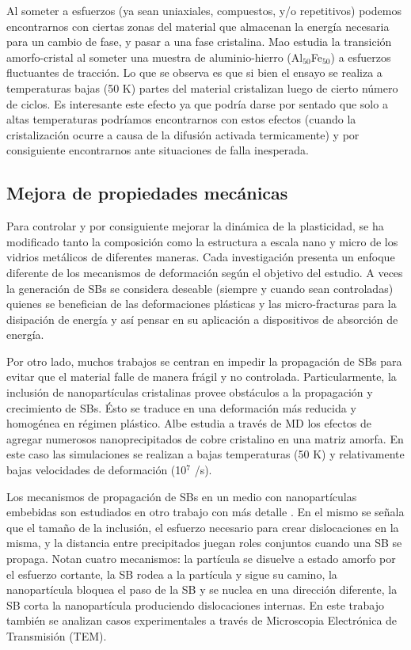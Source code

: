 Al someter a esfuerzos (ya sean uniaxiales, compuestos, y/o repetitivos) podemos encontrarnos con ciertas zonas del material que almacenan la energía necesaria para un cambio de fase, y pasar a una fase cristalina. Mao \citep{ma15} estudia la transición amorfo-cristal al someter una muestra de aluminio-hierro (Al$_{50}$Fe$_{50}$) a esfuerzos fluctuantes de tracción. Lo que se observa es que si bien el ensayo se realiza a temperaturas bajas (50 K) partes del material cristalizan luego de cierto número de ciclos. Es interesante este efecto ya que podría darse por sentado que solo a altas temperaturas podríamos encontrarnos con estos efectos (cuando la cristalización ocurre a causa de la difusión activada termicamente) y por consiguiente encontrarnos ante situaciones de falla inesperada.

\subsection{Mejora de propiedades mecánicas}
\label{S1_2_3}

Para controlar y por consiguiente mejorar la dinámica de la plasticidad, se ha modificado tanto la composición como la estructura a escala nano y micro de los vidrios metálicos de diferentes maneras. Cada investigación presenta un enfoque diferente de los mecanismos de deformación según el objetivo del estudio. A veces la generación de SBs se considera deseable \citep{chen14} (siempre y cuando sean controladas) quienes se benefician de las deformaciones plásticas y las micro-fracturas para la disipación de energía y así pensar en su aplicación a dispositivos de absorción de energía.

Por otro lado, muchos trabajos se centran en impedir la propagación de SBs para evitar que el material falle de manera frágil y no controlada. Particularmente, la inclusión de nanopartículas cristalinas provee obstáculos a la propagación y crecimiento de SBs. Ésto se traduce en una deformación más reducida y homogénea en régimen plástico. Albe \citep{albe13} estudia a través de MD los efectos de agregar numerosos nanoprecipitados de cobre cristalino en una matriz amorfa. En este caso las simulaciones se realizan a bajas temperaturas (50 K) y relativamente bajas velocidades de deformación (10$^{7}$ /s).

Los mecanismos de propagación de SBs en un medio con nanopartículas embebidas son estudiados en otro trabajo con más detalle \citep{brink15}. En el mismo se señala que el tamaño de la inclusión, el esfuerzo necesario para crear dislocaciones en la misma, y la distancia entre precipitados juegan roles conjuntos cuando una SB se propaga. Notan cuatro mecanismos: la partícula se disuelve a estado amorfo por el esfuerzo cortante, la SB rodea a la partícula y sigue su camino, la nanopartícula bloquea el paso de la SB y se nuclea en una dirección diferente, la SB corta la nanopartícula produciendo dislocaciones internas. En este trabajo también se analizan casos experimentales a través de Microscopia Electrónica de Transmisión (TEM).

